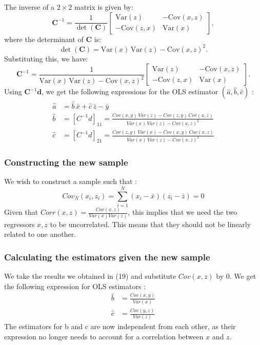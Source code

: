 \documentclass{article}
\begin{document}
The inverse of a $2 \times 2$ matrix is given by:
\begin{equation}
    \mathbf{C}^{-1} = \frac{1}{\det(\mathbf{C})}\begin{bmatrix}    \text{Var}(z) & -\text{Cov}(x, z) \\    -\text{Cov}(z, x) & \text{Var}(x)\end{bmatrix},
\end{equation}
where the determinant of $\mathbf{C}$ is:
\begin{equation}
\det(\mathbf{C}) = \text{Var}(x) \, \text{Var}(z) - \text{Cov}(x, z)^2.
\end{equation}
Substituting this, we have:
\begin{equation}
    \mathbf{C}^{-1} =\frac{1}{\text{Var}(x) \, \text{Var}(z) - \text{Cov}(x, z)^2}\begin{bmatrix}    \text{Var}(z) & -\text{Cov}(x, z) \\    -\text{Cov}(z, x) & \text{Var}(x)\end{bmatrix}.
\end{equation}
Using $\mathbf{C}^{-1} \mathbf{d}$, we get the following expressions for the OLS estimator $(\hat{a},\hat{b},\hat{c})$ : \\
\begin{equation}
\begin{aligned}
    \hat{a} &= \hat{b} \, \bar{x} + \hat{c} \, \bar{z} - \bar{y} \\
    \hat{b} &= [C^{-1}d]_{11} = \frac{Cov(x, y) \, Var(z) - Cov(z, y) \, Cov(x, z)}{Var(x) \, Var(z) - Cov(x, z)^2} \\
    \hat{c} &= [C^{-1}d]_{21} = \frac{Cov(z, y) \, Var(x) - Cov(x, y) \, Cov(x, z)}{Var(x) \, Var(z) - Cov(x, z)^2}
\end{aligned}
\end{equation}
\subsubsection{Constructing the new sample}
We wish to construct a sample such that : 
\begin{equation}
    Cov_N(x_i,z_i) = \sum_{i=1}^N(x_i-\bar{x})(z_i-\bar{z}) = 0
\end{equation}
Given that $Corr(x,z)=\frac{Cov(x,z)}{Var(x)Var(z)}$, this implies that we need the two regressors $x, z$ to be uncorrelated. This means that they should not be linearly related to one another.
\subsubsection{Calculating the estimators given the new sample}
We take the results we obtained in (19) and substitute $Cov(x,z)$ by 0. We get the following expression for OLS estimators : 
\begin{equation}
\begin{aligned}
  \hat{b} & = \frac{Cov(x,y)}{Var(x)}\\
  \hat{c} & = \frac{Cov(y,z)}{Var(z)}
\end{aligned}
\end{equation}
The estimators for b and c are now independent from each other, as their expression no longer needs to account for a correlation between $x$ and $z$.
\end{document}
